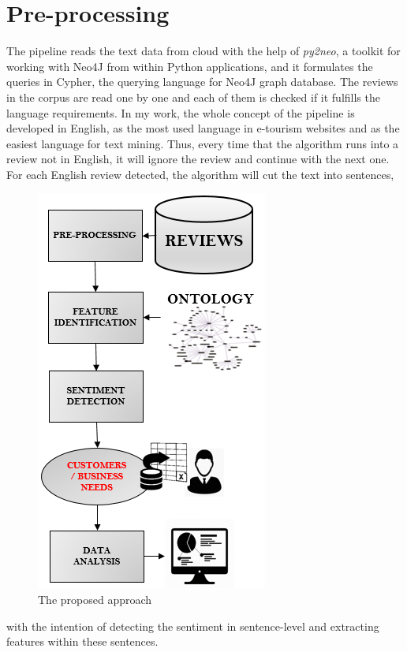 \section{Pre-processing}
%
The pipeline reads the text data from cloud with the help of \textit{py2neo}, a toolkit for working with Neo4J from within Python applications, and it formulates the queries in Cypher, the querying language for Neo4J graph database. The reviews in the corpus are read one by one and each of them is checked if it fulfills the language requirements. In my work, the whole concept of the pipeline is developed in English, as the most used language in e-tourism websites and as the easiest language for text mining. Thus, every time that the algorithm runs into a review not in English, it will ignore the review and continue with the next one. For each English review detected, the algorithm will cut the text into sentences, 
\begin{figure}[h!]
	\centering
	\includegraphics[height=0.5\textheight]{pipe}
	\caption{The proposed approach}
	\label{fig:pipe}
\end{figure} 
with the intention of detecting the sentiment in sentence-level and extracting features within these sentences. 
%
